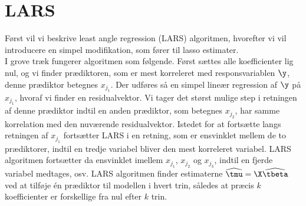 \section{LARS}
Først vil vi beskrive least angle regression (LARS) algoritmen, hvorefter vi vil introducere en simpel modifikation, som fører til lasso estimater. \\[2mm]
%
I grove træk fungerer algoritmen som følgende. 
Først sættes alle koefficienter lig nul, og vi finder prædiktoren, som er mest korreleret med responsvariablen \(\y\), denne prædiktor betegnes \(x_{j_1}\).
Der udføres så en simpel lineær regression af \(\y\) på \(x_{j_1}\), hvoraf vi finder en residualvektor.
Vi tager det størst mulige step i retningen af denne prædiktor indtil en anden prædiktor, som betegnes  \(x_{j_2}\), har samme korrelation med den nuværende residualvektor.
Istedet for at fortsætte langs retningen af \(x_{j_1}\) fortsætter LARS i en retning, som er ensvinklet mellem de to prædiktorer, indtil en tredje variabel bliver den mest korreleret variabel.
LARS algoritmen fortsætter da ensvinklet imellem \(x_{j_1}\), \(x_{j_2}\) og \(x_{j_3}\), indtil en fjerde variabel medtages, osv.
LARS algoritmen finder estimaterne \(\widehat{\tmu} = \X \widehat{\tbeta}\) ved at tilføje én prædiktor til modellen i hvert trin, således at præcis \(k\) koefficienter er forskellige fra nul efter \(k\) trin.

